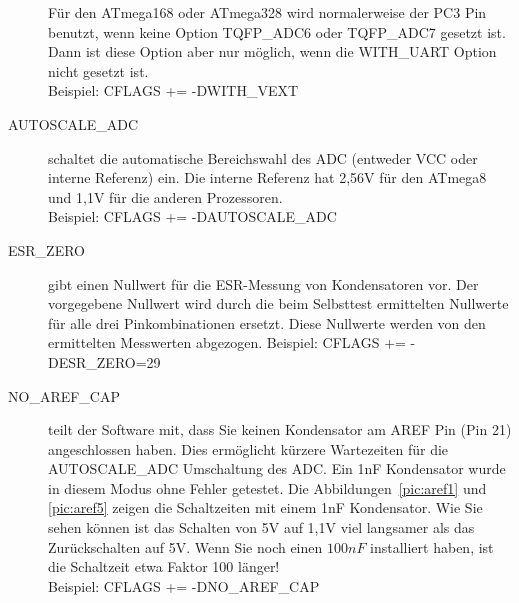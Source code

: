 \begin{description}
Für den ATmega168 oder ATmega328 wird normalerweise der PC3 Pin benutzt, wenn keine Option TQFP\_ADC6 oder
TQFP\_ADC7 gesetzt ist. Dann ist diese Option aber nur möglich, wenn die WITH\_UART Option nicht gesetzt ist.\\
Beispiel: CFLAGS += -DWITH\_VEXT 
  \item[AUTOSCALE\_ADC] schaltet die automatische Bereichswahl des ADC (entweder VCC oder interne Referenz) ein.
Die interne Referenz hat 2,56V für den ATmega8 und 1,1V für die anderen Prozessoren.\\
Beispiel: CFLAGS += -DAUTOSCALE\_ADC
  \item[ESR\_ZERO] gibt einen Nullwert für die ESR-Messung von Kondensatoren vor.
Der vorgegebene Nullwert wird durch die beim Selbsttest ermittelten Nullwerte für alle drei Pinkombinationen ersetzt.
 Diese Nullwerte werden von den ermittelten Messwerten abgezogen.
Beispiel: CFLAGS += -DESR\_ZERO=29
  \item[NO\_AREF\_CAP] teilt der Software mit, dass Sie keinen Kondensator am AREF Pin (Pin 21) angeschlossen haben.
Dies ermöglicht kürzere Wartezeiten für die AUTOSCALE\_ADC Umschaltung des ADC.
Ein 1nF Kondensator wurde in diesem Modus ohne Fehler getestet.
Die Abbildungen~\ref{pic:aref1} und \ref{pic:aref5} zeigen die Schaltzeiten mit einem 1nF Kondensator.
Wie Sie sehen können ist das Schalten von 5V auf 1,1V viel langsamer als das Zurückschalten auf 5V.
Wenn Sie noch einen \(100 nF\) installiert haben, ist die Schaltzeit etwa Faktor 100 länger!\\
Beispiel: CFLAGS += -DNO\_AREF\_CAP

\end{description}

